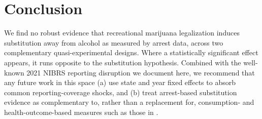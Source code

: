 \documentclass[11pt]{article}
\begin{document}
\section{Conclusion}

We find no robust evidence that recreational marijuana legalization
induces substitution away from alcohol as measured by arrest data,
across two complementary quasi-experimental designs. Where a
statistically significant effect appears, it runs opposite to the
substitution hypothesis. Combined with the well-known 2021 NIBRS
reporting disruption we document here, we recommend that any future
work in this space (a) use state and year fixed effects to absorb
common reporting-coverage shocks, and (b) treat arrest-based
substitution evidence as complementary to, rather than a replacement
for, consumption- and health-outcome-based measures such as those in
\citet{AndersonHansenRees2013}.



\end{document}
